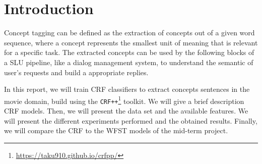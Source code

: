 \section{Introduction}
\label{sec:introduction}

Concept tagging can be defined as the extraction of concepts out of a given word sequence,
where a concept represents the smallest unit of meaning that is relevant for a specific task.
The extracted concepts can be used by the following blocks of a \ac{SLU} pipeline, like a dialog management system, to understand the semantic of user's requests and build a appropriate replies.

In this report, we will train \ac{CRF} classifiers to extract concepts sentences in the movie domain, build using
the \texttt{CRF++}\footnote{\url{https://taku910.github.io/crfpp/}} toolkit.
We will give a brief description \ac{CRF} models.
Then, we will present the data set and the available features.
We will present the different experiments performed and the obtained results.
Finally, we will compare the \ac{CRF} to the \ac{WFST} models of the mid-term project.
